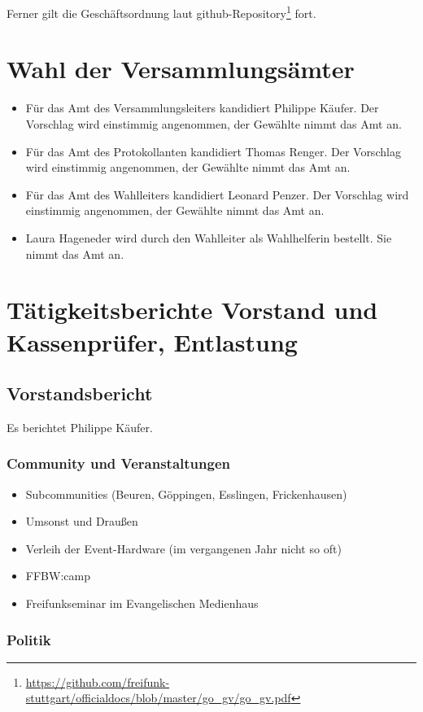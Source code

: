 \documentclass[a4paper]{scrartcl}
\begin{document}
Ferner gilt die Geschäftsordnung laut github-Repository\footnote{\url{https://github.com/freifunk-stuttgart/officialdocs/blob/master/go_gv/go_gv.pdf}} fort.

\section{Wahl der Versammlungsämter}
\begin{itemize}
\item Für das Amt des Versammlungsleiters kandidiert Philippe Käufer. Der Vorschlag wird einstimmig angenommen, der Gewählte nimmt das Amt an.
\item Für das Amt des Protokollanten kandidiert Thomas Renger. Der Vorschlag wird einstimmig angenommen, der Gewählte nimmt das Amt an.
\item Für das Amt des Wahlleiters kandidiert Leonard Penzer. Der Vorschlag wird einstimmig angenommen, der Gewählte nimmt das Amt an.
\item Laura Hageneder wird durch den Wahlleiter als Wahlhelferin bestellt. Sie nimmt das Amt an.
\end{itemize}

\section{Tätigkeitsberichte Vorstand und Kassenprüfer, Entlastung}
\subsection{Vorstandsbericht}
Es berichtet Philippe Käufer.

\subsubsection{Community und Veranstaltungen}
\begin{itemize}
\item Subcommunities (Beuren, Göppingen, Esslingen, Frickenhausen)
\item Umsonst und Draußen
\item Verleih der Event-Hardware (im vergangenen Jahr nicht so oft)
\item FFBW:camp
\item Freifunkseminar im Evangelischen Medienhaus
\end{itemize}

\subsubsection{Politik}
\end{document}
